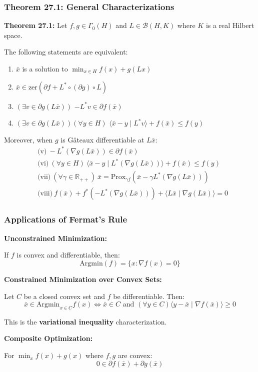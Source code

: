 \documentclass[aspectratio=169,10pt]{beamer}
\begin{document}
\begin{frame}[allowframebreaks]
\frametitle{Theorem 27.1: General Characterizations}

\textbf{Theorem 27.1:} Let $f, g \in \Gamma_0(H)$ and $L \in \mathcal{B}(H, K)$ where $K$ is a real Hilbert space.

The following statements are equivalent:
\begin{enumerate}
    \item[(i)] $\bar{x}$ is a solution to $\min_{x \in H} f(x) + g(Lx)$
    \item[(ii)] $\bar{x} \in \text{zer}(\partial f + L^* \circ (\partial g) \circ L)$
    \item[(iii)] $(\exists v \in \partial g(L\bar{x}))$ $-L^* v \in \partial f(\bar{x})$
    \item[(iv)] $(\exists v \in \partial g(L\bar{x}))(\forall y \in H)$ $\langle \bar{x} - y \mid L^* v \rangle + f(\bar{x}) \leq f(y)$
\end{enumerate}

Moreover, when $g$ is Gâteaux differentiable at $L\bar{x}$:
\begin{align*}
    &\text{(v)}\ -L^*(\nabla g(L\bar{x})) \in \partial f(\bar{x}) \\
    &\text{(vi)}\ (\forall y \in H)\ \langle \bar{x} - y \mid L^*(\nabla g(L\bar{x})) \rangle + f(\bar{x}) \leq f(y) \\
    &\text{(vii)}\ (\forall \gamma \in \mathbb{R}_{++})\ \bar{x} = \text{Prox}_{\gamma f}(\bar{x} - \gamma L^*(\nabla g(L\bar{x}))) \\
    &\text{(viii)}\ f(\bar{x}) + f^*(-L^*(\nabla g(L\bar{x}))) + \langle L\bar{x} \mid \nabla g(L\bar{x}) \rangle = 0
\end{align*}

\end{frame}

\begin{frame}[allowframebreaks]
\frametitle{Applications of Fermat's Rule}

\textbf{Unconstrained Minimization:}

If $f$ is convex and differentiable, then:
\[\text{Argmin}(f) = \{x : \nabla f(x) = 0\}\]

\textbf{Constrained Minimization over Convex Sets:}

Let $C$ be a closed convex set and $f$ be differentiable. Then:
\[\bar{x} \in \text{Argmin}_{x \in C} f(x) \iff \bar{x} \in C \text{ and } (\forall y \in C) \langle y - \bar{x} \mid \nabla f(\bar{x}) \rangle \geq 0\]

This is the \textbf{variational inequality} characterization.

\vspace{0.3cm}

\textbf{Composite Optimization:}

For $\min_x f(x) + g(x)$ where $f, g$ are convex:
\[0 \in \partial f(\bar{x}) + \partial g(\bar{x})\]

\end{frame}
\end{document}
